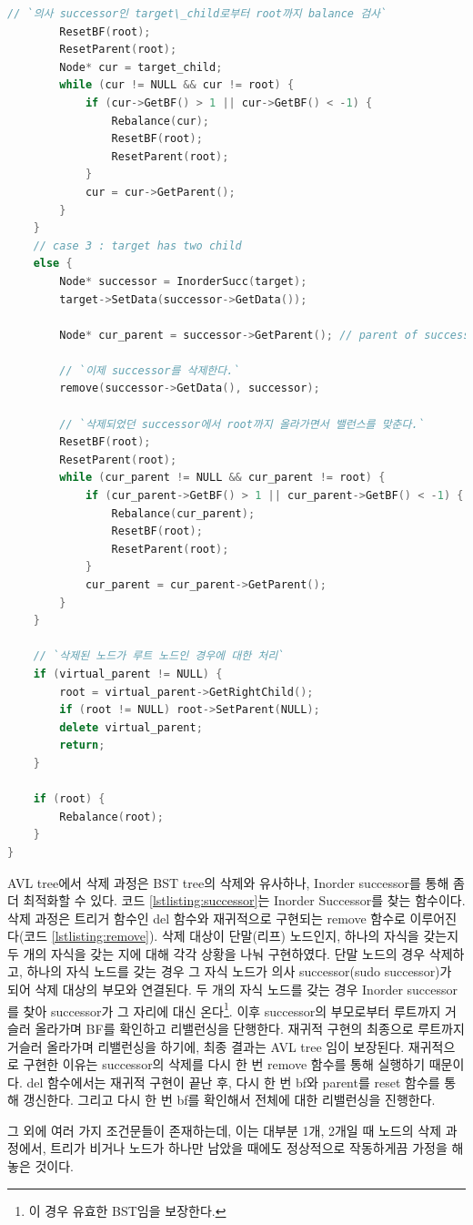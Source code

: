 \documentclass{article}
\begin{document}
\begin{lstlisting}[language=C++, escapeinside=``, caption=remove, label={lstlisting:remove}]
		// `의사 successor인 target\_child로부터 root까지 balance 검사`
		ResetBF(root);
		ResetParent(root);
		Node* cur = target_child;
		while (cur != NULL && cur != root) {
			if (cur->GetBF() > 1 || cur->GetBF() < -1) {
				Rebalance(cur);
				ResetBF(root);
				ResetParent(root);
			}
			cur = cur->GetParent();
		}
	}
	// case 3 : target has two child
	else {
		Node* successor = InorderSucc(target);
		target->SetData(successor->GetData());
		
		Node* cur_parent = successor->GetParent(); // parent of successor
		
		// `이제 successor를 삭제한다.`
		remove(successor->GetData(), successor);

		// `삭제되었던 successor에서 root까지 올라가면서 밸런스를 맞춘다.`
		ResetBF(root);
		ResetParent(root);
		while (cur_parent != NULL && cur_parent != root) {
			if (cur_parent->GetBF() > 1 || cur_parent->GetBF() < -1) {
				Rebalance(cur_parent);
				ResetBF(root);
				ResetParent(root); 
			}
			cur_parent = cur_parent->GetParent();
		}
	}
	
	// `삭제된 노드가 루트 노드인 경우에 대한 처리`
	if (virtual_parent != NULL) {
		root = virtual_parent->GetRightChild();
		if (root != NULL) root->SetParent(NULL);
		delete virtual_parent;
		return;
	}

	if (root) {
		Rebalance(root);
	}
}
\end{lstlisting}
AVL tree에서 삭제 과정은 BST tree의 삭제와 유사하나, Inorder successor를 통해 좀 더 최적화할 수 있다. 코드 \ref{lstlisting:successor}는 Inorder Successor를 찾는 함수이다. 삭제 과정은 트리거 함수인 del 함수와 재귀적으로 구현되는 remove 함수로 이루어진다(코드 \ref{lstlisting:remove}). 삭제 대상이 단말(리프) 노드인지, 하나의 자식을 갖는지 두 개의 자식을 갖는 지에 대해 각각 상황을 나눠 구현하였다. 단말 노드의 경우 삭제하고, 하나의 자식 노드를 갖는 경우 그 자식 노드가 의사 successor(sudo successor)가 되어 삭제 대상의 부모와 연결된다. 두 개의 자식 노드를 갖는 경우 Inorder successor를 찾아 successor가 그 자리에 대신 온다\footnote{이 경우 유효한 BST임을 보장한다.}. 이후 successor의 부모로부터 루트까지 거슬러 올라가며 BF를 확인하고 리밸런싱을 단행한다. 재귀적 구현의 최종으로 루트까지 거슬러 올라가며 리밸런싱을 하기에, 최종 결과는 AVL tree 임이 보장된다. 재귀적으로 구현한 이유는 successor의 삭제를 다시 한 번 remove 함수를 통해 실행하기 때문이다. del 함수에서는 재귀적 구현이 끝난 후, 다시 한 번 bf와 parent를 reset 함수를 통해 갱신한다. 그리고 다시 한 번 bf를 확인해서 전체에 대한 리밸런싱을 진행한다.

그 외에 여러 가지 조건문들이 존재하는데, 이는 대부분 1개, 2개일 때 노드의 삭제 과정에서, 트리가 비거나 노드가 하나만 남았을 때에도 정상적으로 작동하게끔 가정을 해놓은 것이다.
\end{document}
